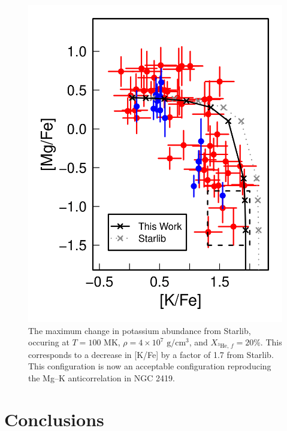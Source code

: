 \begin{figure}[t]
\includegraphics[width=6.5in]{Chapter-6/figs/MaxKSeparation_T100_rho4d7_xlast20_HDA.png}
\caption{\label{fig:MaxSeparation}The maximum change in potassium abundance from Starlib, occuring at $T = 100$ MK, $\rho = 4 \times 10^{7}$ $\mathrm{g}/\mathrm{cm}^{3}$, and $X_{^{3}\mathrm{He}, \, f} = 20\%$. This corresponds to a decrease in [K/Fe] by a factor of 1.7 from Starlib. This configuration is now an acceptable configuration reproducing the Mg--K anticorrelation in NGC 2419.}
\end{figure}

\section{Conclusions}


